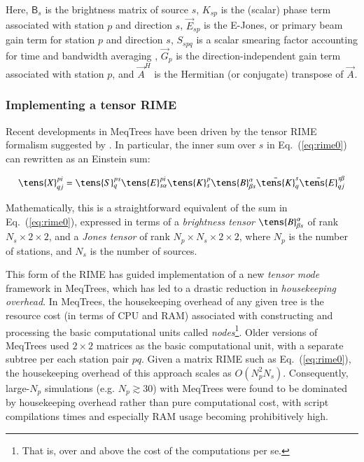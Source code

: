 \documentclass{aa}
\newcommand{\herm}{H}
\newcommand{\jones}[2]{\vec {#1}_{#2}}
\newcommand{\jonesT}[2]{\vec {#1}^{\herm}_{#2}}
\newcommand{\coh}[2]{\mathsf{{#1}}_{{#2}}}
\begin{document}
Here, $\coh{B}{s}$ is the brightness matrix of source $s$, $K_{sp}$ is the (scalar) phase term associated with station $p$  and direction $s$, $\jones{E}{sp}$ is the E-Jones, or primary beam gain term for station $p$ and direction $s$, $S_{spq}$ is a scalar smearing factor accounting for time and bandwidth averaging \citep[implemented as per Eq. (23) of ][]{RRIME1}, $\jones{G}{p}$ is the direction-independent gain term associated with station $p$, and $\jonesT{A}{}$ is the Hermitian (or conjugate) transpose of $\jones{A}{}$.

\subsubsection{Implementing a tensor RIME}

Recent developments in MeqTrees have been driven by the tensor RIME formalism suggested by \citet{RRIME4}. In particular, the inner sum over $s$ in Eq.~(\ref{eq:rime0}) can rewritten as an Einstein sum:

\begin{equation}
\label{eq:trime}
\tens{X}^{pi}_{qj} = 
  \tens{S}_{q}^{ps}\tens{E}_{s\alpha}^{pi}\tens{K}_{s}^{p}
  \tens{B}^\alpha_{\beta s}
  \bar\tens{K}_{q}^{s}
  \bar\tens{E}_{qj}^{s\beta}
\end{equation}

Mathematically, this is a straightforward equivalent of the sum in Eq.~(\ref{eq:rime0}), expressed in terms of a {\em brightness tensor} $\tens{B}^\alpha_{\beta s}$ of rank $N_s\times2\times2$, and a \emph{Jones tensor} of rank $N_p\times N_s\times2\times2$, where $N_p$ is the number of stations, and $N_s$ is the number of sources.

This form of the RIME has guided implementation of a new {\em tensor mode} framework in MeqTrees, which has led to a drastic reduction in {\em housekeeping overhead}. In MeqTrees, the housekeeping overhead of any given tree is the resource cost (in terms of CPU and RAM) associated with constructing and processing the basic computational units called {\em nodes}\footnote{That is, over and above the cost of the computations per se.}. Older versions of MeqTrees used $2\times2$ matrices as the basic computational unit, with a separate subtree per each station pair $pq$. Given a matrix RIME such as Eq.~(\ref{eq:rime0}), the housekeeping overhead of this approach scales as $O(N_p^2 N_s)$. Consequently, large-$N_p$ simulations (e.g. $N_p\gtrsim 30$) with MeqTrees were found to be dominated by housekeeping overhead rather than pure computational cost, with script compilations times and especially RAM usage becoming prohibitively high.
\end{document}
